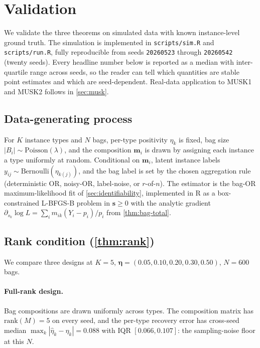 \section{Validation}
\label{sec:validation}

We validate the three theorems on simulated data with known
instance-level ground truth. The simulation is implemented in
\texttt{scripts/sim.R} and \texttt{scripts/run.R}, fully reproducible
from seeds \texttt{20260523} through \texttt{20260542} (twenty
seeds). Every headline number below is reported as a median with
inter-quartile range across seeds, so the reader can tell which
quantities are stable point estimates and which are
seed-dependent. Real-data application to MUSK1 and MUSK2 follows in
\cref{sec:musk}.

\subsection{Data-generating process}

For $K$ instance types and $N$ bags, per-type positivity $\eta_k$ is
fixed, bag size $|B_i| \sim \mathrm{Poisson}(\lambda)$, and the
composition $\bm{m}_i$ is drawn by assigning each instance a type
uniformly at random. Conditional on $\bm{m}_i$, latent instance
labels $y_{ij} \sim \mathrm{Bernoulli}(\eta_{k(j)})$, and the bag
label is set by the chosen aggregation rule (deterministic OR,
noisy-OR, label-noise, or $r$-of-$n$). The estimator is the
bag-OR maximum-likelihood fit of \cref{sec:identifiability},
implemented in R as a box-constrained L-BFGS-B problem in
$\bm{s} \geq 0$ with the analytic gradient
$\partial_{s_k}\log L = \sum_i m_{ik}(Y_i - p_i)/p_i$ from
\cref{thm:bag-total}.

\subsection{Rank condition (\cref{thm:rank})}

We compare three designs at $K = 5$,
$\bm{\eta} = (0.05, 0.10, 0.20, 0.30, 0.50)$, $N = 600$ bags.

\paragraph{Full-rank design.} Bag compositions are drawn uniformly
across types. The composition matrix has $\mathrm{rank}(M) = 5$ on
every seed, and the per-type recovery error has cross-seed median
$\max_k|\hat\eta_k - \eta_k| = 0.088$ with IQR $[0.066, 0.107]$:
the sampling-noise floor at this $N$.

